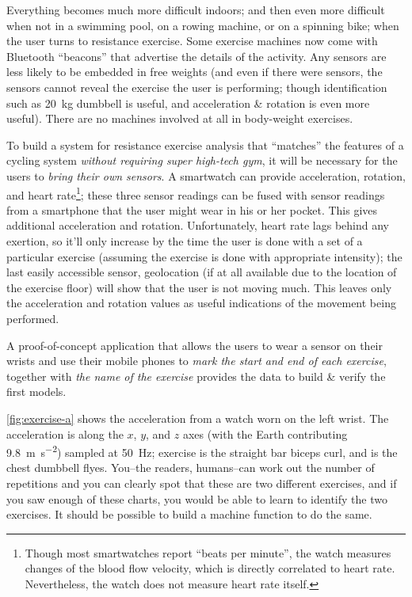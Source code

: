 
Everything becomes much more difficult indoors; and then even more difficult when not in a swimming pool, on a rowing machine, or on a spinning bike; when the user turns to resistance exercise. Some exercise machines now come with Bluetooth ``beacons'' that advertise the details of the activity. Any sensors are less likely to be embedded in free weights (and even if there were sensors, the sensors cannot reveal the exercise the user is performing; though identification such as \SI{20}{\kg} dumbbell is useful, and acceleration \& rotation is even more useful). There are no machines involved at all in body-weight exercises. 

To build a system for resistance exercise analysis that ``matches'' the features of a cycling system \emph{without requiring super high-tech gym}, it will be necessary for the users to \emph{bring their own sensors}. A smartwatch can provide acceleration, rotation, and heart rate\footnote{Though most smartwatches report ``beats per minute'', the watch measures changes of the blood flow velocity, which is directly correlated to heart rate. Nevertheless, the watch does not measure heart rate itself.}; these three sensor readings can be fused with sensor readings from a smartphone that the user might wear in his or her pocket. This gives additional acceleration and rotation. Unfortunately, heart rate lags behind any exertion, so it'll only increase by the time the user is done with a set of a particular exercise (assuming the exercise is done with appropriate intensity); the last easily accessible sensor, geolocation (if at all available due to the location of the exercise floor) will show that the user is not moving much. This leaves only the acceleration and rotation values as useful indications of the movement being performed. 

A proof-of-concept application that allows the users to wear a sensor on their wrists and use their mobile phones to \emph{mark the start and end of each exercise}, together with \emph{the name of the exercise} provides the data to build \& verify the first models. 


\autoref{fig:exercise-a} shows the acceleration from a watch worn on the left wrist. The acceleration is along the $x$, $y$, and $z$ axes (with the Earth contributing \SI{9.8}{\meter\second^{-2}}) sampled at \SI{50}{\hertz}; exercise  is the straight bar biceps curl, and  is the chest dumbbell flyes. You--the readers, humans--can work out the number of repetitions and you can clearly spot that these are two different exercises, and if you saw enough of these charts, you would be able to learn to identify the two exercises. It should be possible to build a machine function to do the same.

